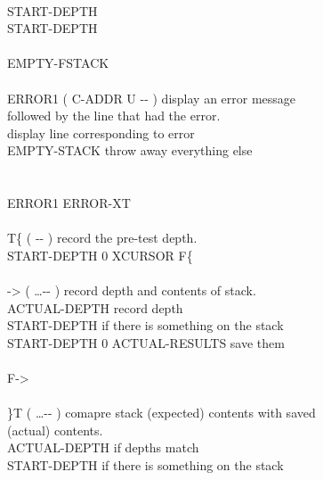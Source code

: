 \begin{tt}
\tab {} \\
\tab {} START-DEPTH    \\
\tab[2]  START-DEPTH     \\
\tab {} \\
\tab EMPTY-FSTACK \word{;} \\
\\
\word{:} ERROR1	 ( C-ADDR U -{}- ) display an error message  \\
\tab[4.8]  followed by the line that had the error. \\
\tab {}   			 display line corresponding to error \\
\tab EMPTY-STACK          throw away everything else \\
\word{;} \\
\\
 ERROR1 ERROR-XT \word{!} \\
\\
\word{:} T\{		 ( -{}- ) record the pre-test depth. \\
\tab {} START-DEPTH \word{!} 0 XCURSOR \word{!} F\{ \word{;} \\
\\
\word{:} ->		 ( \ldots -{}- ) record depth and contents of stack. \\
\tab {}  ACTUAL-DEPTH \word{!}		 record depth \\
\tab START-DEPTH   		 if there is something on the stack \\
\tab[2]  START-DEPTH  \word{-} 0  ACTUAL-RESULTS   \word{+} \word{!}   save them \\
\tab {} \\
\tab F-> \word{;} \\
\\
\word{:} \}T		 ( \ldots -{}- ) comapre stack (expected) contents with saved \\
\tab   {} (actual) contents. \\
\tab {} ACTUAL-DEPTH  \word{=} 		\tab[4.0]	 if depths match \\
\tab[2]  START-DEPTH   	\tab[3.6]	 if there is something on the stack \\

\end{tt}
